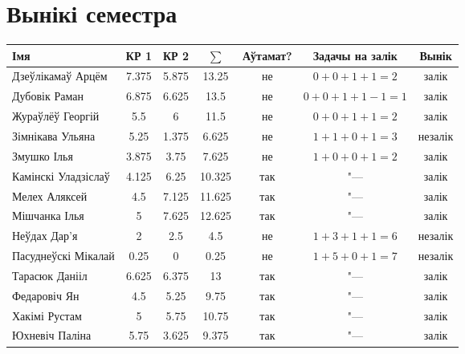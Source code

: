 \documentclass[12pt, a4paper]{extarticle}
\begin{document}
    \section{Вынікі семестра}
    \begin{table}[H]
        \begin{tabular}{|l|c|c|c|c|c|c|}
            \hline
            Імя                 & КР 1  & КР 2  & $\sum$ & Аўтамат? & Задачы на залік &  Вынік  \\ \hline
            Дзеўлікамаў Арцём   & 7.375 & 5.875 & 13.25  &    не    &   $0+0+1+1=2$   &  залік  \\ \hline
            Дубовік Раман       & 6.875 & 6.625 &  13.5  &    не    &  $0+0+1+1-1=1$  &  залік  \\ \hline
            Жураўлёў Георгій    &  5.5  &   6   &  11.5  &    не    &   $0+0+1+1=2$   &  залік  \\ \hline
            Зімнікава Ульяна    & 5.25  & 1.375 & 6.625  &    не    &   $1+1+0+1=3$   & незалік \\ \hline
            Змушко Ілья         & 3.875 & 3.75  & 7.625  &    не    &   $1+0+0+1=2$   &  залік  \\ \hline
            Камінскі Уладзіслаў & 4.125 &  6.25 & 10.325 &   так    &      "---       &  залік  \\ \hline
            Мелех Аляксей       &  4.5  & 7.125 & 11.625 &   так    &      "---       &  залік  \\ \hline
            Мішчанка Ілья       &   5   & 7.625 & 12.625 &   так    &      "---       &  залік  \\ \hline
            Неўдах Дар'я        &   2   &  2.5  &  4.5   &    не    &   $1+3+1+1=6$   & незалік \\ \hline
            Пасуднеўскі Мікалай & 0.25  &   0   &  0.25  &    не    &   $1+5+0+1=7$   & незалік \\ \hline
            Тарасюк Данііл      & 6.625 & 6.375 &   13   &   так    &      "---       &  залік  \\ \hline
            Федаровіч Ян        &  4.5  & 5.25  &  9.75  &   так    &      "---       &  залік  \\ \hline
            Хакімі Рустам       &   5   & 5.75  & 10.75  &   так    &      "---       &  залік  \\ \hline
            Юхневіч Паліна      & 5.75  & 3.625 & 9.375  &   так    &      "---       &  залік  \\ \hline
        \end{tabular}
    \end{table}
\end{document}
